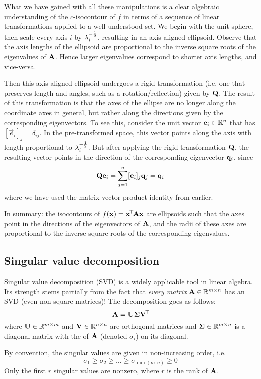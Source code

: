 What we have gained with all these manipulations is a clear algebraic understanding of the $c$-isocontour of $f$ in terms of a sequence of linear transformations applied to a well-understood set.
We begin with the unit sphere, then scale every axis $i$ by $\lambda_i^{-\frac{1}{2}}$, resulting in an axis-aligned ellipsoid.
Observe that the axis lengths of the ellipsoid are proportional to the inverse square roots of the eigenvalues of $\mathbf{A}$.
Hence larger eigenvalues correspond to shorter axis lengths, and vice-versa.

Then this axis-aligned ellipsoid undergoes a rigid transformation (i.e. one that preserves length and angles, such as a rotation/reflection) given by $\mathbf{Q}$.
The result of this transformation is that the axes of the ellipse are no longer along the coordinate axes in general, but rather along the directions given by the corresponding eigenvectors.
To see this, consider the unit vector $\mathbf{e}_i \in \mathbb{R}^n$ that has $[\vec{e}_i]_j = \delta_{ij}$.
In the pre-transformed space, this vector points along the axis with length proportional to $\lambda_i^{-\frac{1}{2}}$.
But after applying the rigid transformation $\mathbf{Q}$, the resulting vector points in the direction of the corresponding eigenvector $\mathbf{q}_i$, since
\[\mathbf{Q}\mathbf{e}_i = \sum_{j=1}^n [\mathbf{e}_i]_j\mathbf{q}_j = \mathbf{q}_i\]
where we have used the matrix-vector product identity from earlier.

In summary: the isocontours of $f(\mathbf{x}) = \mathbf{x}^{\!\top\!}\mathbf{A}\mathbf{x}$ are ellipsoids such that the axes point in the directions of the eigenvectors of $\mathbf{A}$, and the radii of these axes are proportional to the inverse square roots of the corresponding eigenvalues.

\subsection{Singular value decomposition}
Singular value decomposition (SVD) is a widely applicable tool in linear algebra.
Its strength stems partially from the fact that \textit{every matrix} $\mathbf{A} \in \mathbb{R}^{m \times n}$ has an SVD (even non-square matrices)!
The decomposition goes as follows:
\[\mathbf{A} = \mathbf{U}\mathbf{\Sigma}\mathbf{V}^{\!\top\!}\]
where $\mathbf{U} \in \mathbb{R}^{m \times m}$ and $\mathbf{V} \in \mathbb{R}^{n \times n}$ are orthogonal matrices and $\mathbf{\Sigma} \in \mathbb{R}^{m \times n}$ is a diagonal matrix with the  of $\mathbf{A}$ (denoted $\sigma_i$) on its diagonal.

By convention, the singular values are given in non-increasing order, i.e.
\[\sigma_1 \geq \sigma_2 \geq \dots \geq \sigma_{\min(m,n)} \geq 0\]
Only the first $r$ singular values are nonzero, where $r$ is the rank of $\mathbf{A}$.

